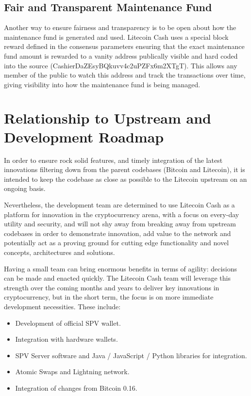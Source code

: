 \documentclass{IOS-Book-Article}
\begin{document}
\subsection{Fair and Transparent Maintenance Fund}

Another way to ensure fairness and transparency is to be open about how the maintenance fund is generated and used. 
Litecoin Cash uses a special block reward defined in the consensus parameters ensuring that the exact maintenance 
fund amount is rewarded to a vanity address publically visible and hard coded into the source (CashierDaZEsyBQkuvv4c2uPZFx6m2XTgT). This allows any member of the public to 
watch this address and track the transactions over time, giving visibility into how the maintenance fund is being managed.

\section{Relationship to Upstream and Development Roadmap}

In order to ensure rock solid features, and timely integration of the latest innovations filtering down from the parent codebases (Bitcoin and Litecoin), it is intended to keep the codebase as close as possible to the Litecoin upstream on an ongoing basis.

Nevertheless, the development team are determined to use Litecoin Cash as a platform for innovation in the cryptocurrency arena, with a focus on every-day utility and security, and will not shy away from breaking away from upstream codebases in order to demonstrate innovation, add value to the network and potentially act as a proving ground for cutting edge functionality and novel concepts, architectures and solutions.

Having a small team can bring enormous benefits in terms of agility: decisions can be made and enacted quickly. The Litecoin Cash team will 
leverage this strength over the coming months and years to deliver key innovations in cryptocurrency, but in the short term, the focus is on more immediate development necessities. These include:

\begin{itemize}
  \item Development of official SPV wallet.
  \item Integration with hardware wallets.
  \item SPV Server software and Java / JavaScript / Python libraries for integration.
  \item Atomic Swaps and Lightning network.
  \item Integration of changes from Bitcoin 0.16.  
\end{itemize}
\end{document}
